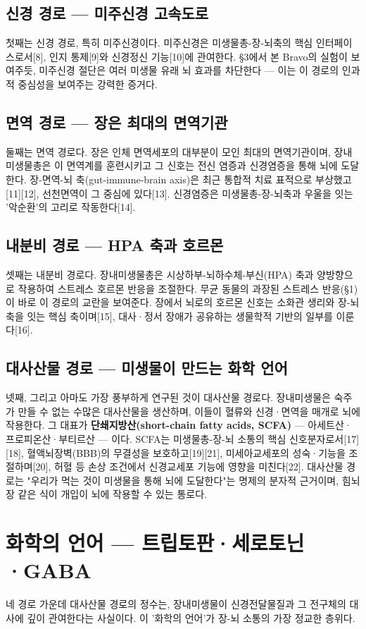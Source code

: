 \documentclass[11pt,oneside]{book}
\begin{document}
\subsection{신경 경로 — 미주신경 고속도로}
첫째는 신경 경로, 특히 미주신경이다. 미주신경은 미생물총-장-뇌축의 핵심 인터페이스로서[8], 인지 통제[9]와 신경정신 기능[10]에 관여한다. §3에서 본 Bravo의 실험이 보여주듯, 미주신경 절단은 여러 미생물 유래 뇌 효과를 차단한다 — 이는 이 경로의 인과적 중심성을 보여주는 강력한 증거다.

\subsection{면역 경로 — 장은 최대의 면역기관}
둘째는 면역 경로다. 장은 인체 면역세포의 대부분이 모인 최대의 면역기관이며, 장내미생물총은 이 면역계를 훈련시키고 그 신호는 전신 염증과 신경염증을 통해 뇌에 도달한다. 장-면역-뇌 축(gut-immune-brain axis)은 최근 통합적 치료 표적으로 부상했고[11][12], 선천면역이 그 중심에 있다[13]. 신경염증은 미생물총-장-뇌축과 우울을 잇는 '악순환'의 고리로 작동한다[14].

\subsection{내분비 경로 — HPA 축과 호르몬}
셋째는 내분비 경로다. 장내미생물총은 시상하부-뇌하수체-부신(HPA) 축과 양방향으로 작용하여 스트레스 호르몬 반응을 조절한다. 무균 동물의 과장된 스트레스 반응(§1)이 바로 이 경로의 교란을 보여준다. 장에서 뇌로의 호르몬 신호는 소화관 생리와 장-뇌축을 잇는 핵심 축이며[15], 대사·정서 장애가 공유하는 생물학적 기반의 일부를 이룬다[16].

\subsection{대사산물 경로 — 미생물이 만드는 화학 언어}
넷째, 그리고 아마도 가장 풍부하게 연구된 것이 대사산물 경로다. 장내미생물은 숙주가 만들 수 없는 수많은 대사산물을 생산하며, 이들이 혈류와 신경·면역을 매개로 뇌에 작용한다. 그 대표가 \textbf{단쇄지방산(short-chain fatty acids, SCFA)} — 아세트산·프로피온산·부티르산 — 이다. SCFA는 미생물총-장-뇌 소통의 핵심 신호분자로서[17][18], 혈액뇌장벽(BBB)의 무결성을 보호하고[19][21], 미세아교세포의 성숙·기능을 조절하며[20], 허혈 등 손상 조건에서 신경교세포 기능에 영향을 미친다[22]. 대사산물 경로는 "우리가 먹는 것이 미생물을 통해 뇌에 도달한다"는 명제의 분자적 근거이며, 힘뇌장 같은 식이 개입이 뇌에 작용할 수 있는 통로다.

\section{화학의 언어 — 트립토판·세로토닌·GABA}
네 경로 가운데 대사산물 경로의 정수는, 장내미생물이 신경전달물질과 그 전구체의 대사에 깊이 관여한다는 사실이다. 이 '화학의 언어'가 장-뇌 소통의 가장 정교한 층위다.
\end{document}
